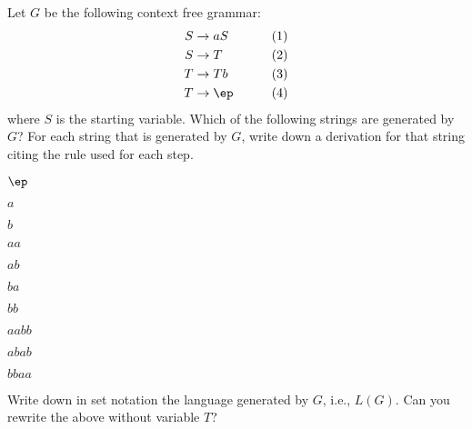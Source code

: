 Let $G$ be the following context free grammar:
\begin{align*}
  S &\rightarrow aS & \tag{1} \\
  S &\rightarrow T  & \tag{2} \\
  T &\rightarrow Tb & \tag{3} \\
  T &\rightarrow \ep & \tag{4} \\
\end{align*}
where $S$ is the starting variable.
Which of the following strings are generated by $G$?
For each string that is generated by $G$, write down a derivation for
that string citing the rule used for each step.
\begin{tightlist}
\item $\ep$
\item $a$
\item $b$
\item $aa$
\item $ab$
\item $ba$
\item $bb$
\item $aabb$
\item $abab$
\item $bbaa$
\end{tightlist}
Write down in set notation the language generated by $G$, i.e., $L(G)$.
Can you rewrite the above without variable $T$?

